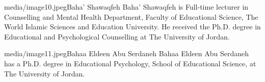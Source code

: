 \documentclass[10pt]{NSP1}
\begin{document}
\begin{biographyps}{media/image10.jpeg}{Baha' Shawaqfeh}
Baha' Shawaqfeh is Full-time lecturer in Counselling and Mental Health Department, Faculty of Educational Science, The World Islamic Sciences and Education University. He received the Ph.D. degree in Educational and Psychological Counselling at The University of Jordan.\end{biographyps}

\begin{biographyps}{media/image11.jpeg}{Bahaa Eldeen Abu Serdaneh}
Bahaa Eldeen Abu Serdaneh has a Ph.D. degree in Educational Psychology, School of Educational Science, at The University of Jordan.\end{biographyps}
\end{document}
